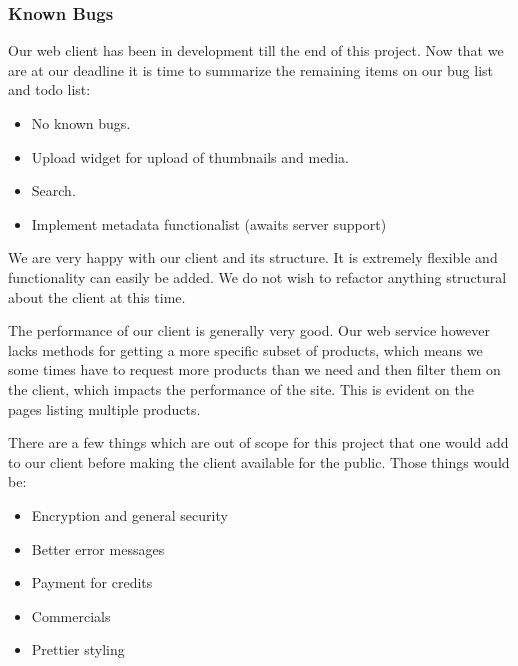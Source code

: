 \subsubsection{Known Bugs}
Our web client has been in development till the end of this project. Now that we are at our deadline it is time to summarize the remaining items on our bug list and todo list:

\begin{itemize}
\item No known bugs.
\end{itemize}

\begin{itemize}
\item Upload widget for upload of thumbnails and media.
\item Search.
\item Implement metadata functionalist (awaits server support)
\end{itemize}

We are very happy with our client and its structure. It is extremely flexible and functionality can easily be added. We do not wish to refactor anything structural about the client at this time.

The performance of our client is generally very good. Our web service however lacks methods for getting a more specific subset of products, which means we some times have to request more products than we need and then filter them on the client, which impacts the performance of the site. This is evident on the pages listing multiple products.

There are a few things which are out of scope for this project that one would add to our client before making the client available for the public. Those things would be:
\begin{itemize}
\item Encryption and general security
\item Better error messages
\item Payment for credits
\item Commercials
\item Prettier styling
\end{itemize}